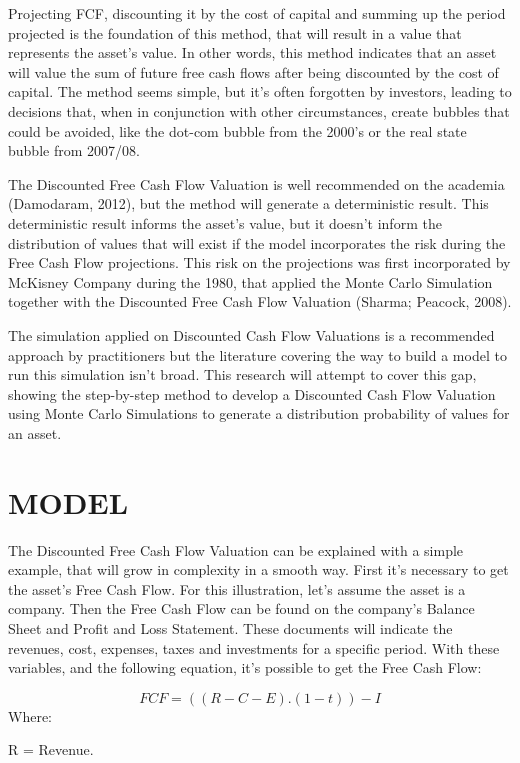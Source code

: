 \documentclass[
  11pt,
  a4paper,
]{article}
\begin{document}
Projecting FCF, discounting it by the cost of capital and summing up the period projected is the foundation of this method, that will result in a value that represents the asset's value. In other words, this method indicates that an asset will value the sum of future free cash flows after being discounted by the cost of capital. The method seems simple, but it's often forgotten by investors, leading to decisions that, when in conjunction with other circumstances, create bubbles that could be avoided, like the dot-com bubble from the 2000's or the real state bubble from 2007/08.

The Discounted Free Cash Flow Valuation is well recommended on the academia (Damodaram, 2012), but the method will generate a deterministic result. This deterministic result informs the asset's value, but it doesn't inform the distribution of values that will exist if the model incorporates the risk during the Free Cash Flow projections. This risk on the projections was first incorporated by McKisney Company during the 1980, that applied the Monte Carlo Simulation together with the Discounted Free Cash Flow Valuation (Sharma; Peacock, 2008).

The simulation applied on Discounted Cash Flow Valuations is a recommended approach by practitioners but the literature covering the way to build a model to run this simulation isn't broad. This research will attempt to cover this gap, showing the step-by-step method to develop a Discounted Cash Flow Valuation using Monte Carlo Simulations to generate a distribution probability of values for an asset.

\hypertarget{model}{%
\section{MODEL}\label{model}}

The Discounted Free Cash Flow Valuation can be explained with a simple example, that will grow in complexity in a smooth way. First it's necessary to get the asset's Free Cash Flow. For this illustration, let's assume the asset is a company. Then the Free Cash Flow can be found on the company's Balance Sheet and Profit and Loss Statement. These documents will indicate the revenues, cost, expenses, taxes and investments for a specific period. With these variables, and the following equation, it's possible to get the Free Cash Flow:

\[FCF = ((R-C-E).(1-t))-I\]
Where:

R = Revenue.
\end{document}
